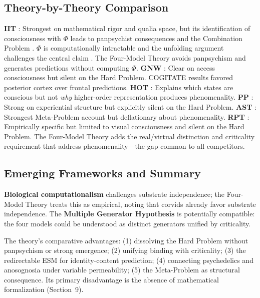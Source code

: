 \documentclass[12pt]{article}
\begin{document}
\subsection{Theory-by-Theory Comparison}

\textbf{IIT} \citep{Tononi2004,Albantakis2023}: Strongest on mathematical rigor and qualia space, but its identification of consciousness with $\Phi$ leads to panpsychist consequences and the Combination Problem \citep{Chalmers2016}. $\Phi$ is computationally intractable \citep{Aaronson2014} and the unfolding argument challenges the central claim \citep{Doerig2019}. The Four-Model Theory avoids panpsychism and generates predictions without computing $\Phi$. \textbf{GNW} \citep{Baars1988,Dehaene2011}: Clear on access consciousness but silent on the Hard Problem. COGITATE results \citeyearpar{COGITATE2025} favored posterior cortex over frontal predictions. \textbf{HOT} \citep{Rosenthal2005,Lau2011}: Explains which states are conscious but not \emph{why} higher-order representation produces phenomenality. \textbf{PP} \citep{Seth2021}: Strong on experiential structure but explicitly silent on the Hard Problem. \textbf{AST} \citep{Graziano2013}: Strongest Meta-Problem account but deflationary about phenomenality. \textbf{RPT} \citep{Lamme2006,Lamme2010}: Empirically specific but limited to visual consciousness and silent on the Hard Problem. The Four-Model Theory adds the real/virtual distinction and criticality requirement that address phenomenality---\hspace{0pt}the gap common to all competitors.


\subsection{Emerging Frameworks and Summary}

\textbf{Biological computationalism} \citep{Milinkovic2025} challenges substrate independence; the Four-Model Theory treats this as empirical, noting that corvids already favor substrate independence. The \textbf{Multiple Generator Hypothesis} \citep{KirkebyHinrup2025} is potentially compatible: the four models could be understood as distinct generators unified by criticality.

The theory's comparative advantages: (1) dissolving the Hard Problem without panpsychism or strong emergence; (2) unifying binding with criticality; (3) the redirectable ESM for identity-content prediction; (4) connecting psychedelics and anosognosia under variable permeability; (5) the Meta-Problem as structural consequence. Its primary disadvantage is the absence of mathematical formalization (Section~9).
\end{document}
